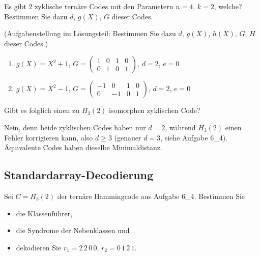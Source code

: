 \begin{aufgabe}[6\_6]
Es gibt 2 zyklische ternäre Codes mit den Parametern $n = 4$, $k = 2$, welche?
Bestimmen Sie dazu $d$, $g(X)$, $G$ dieser Codes.
\end{aufgabe}

\begin{loesung}
(Aufgabenstellung im Lösungsteil: Bestimmen Sie dazu $d$, $g(X)$, $h(X)$, $G$, $H$ dieser Codes.)
\begin{enumerate}
  \item $g(X) = X^2 + 1$, \quad $G = \begin{pmatrix} 1 & 0 & 1 & 0\\ 0 & 1 & 0 & 1 \end{pmatrix}$, \quad $d = 2$, $e = 0$
  \item $g(X) = X^2 - 1$, \quad $G = \begin{pmatrix} -1 & 0 & 1 & 0\\ 0 & -1 & 0 & 1 \end{pmatrix}$, \quad $d = 2$, $e = 0$
\end{enumerate}
\end{loesung}

\begin{aufgabe}[6\_7]
Gibt es folglich einen zu $H_3(2)$ isomorphen zyklischen Code?
\end{aufgabe}

\begin{loesung}
Nein, denn beide zyklischen Codes haben nur $d = 2$, %
während $H_3(2)$ einen Fehler korrigieren kann, also $d \geq 3$ (genauer $d = 3$, siehe Aufgabe 6\_4). Äquivalente Codes haben dieselbe Minimaldistanz.
\end{loesung}

\subsection{Standardarray-Decodierung}

\begin{aufgabe}[6\_8]
Sei $C = H_3(2)$ der ternäre Hammingcode aus Aufgabe 6\_4. Bestimmen Sie
\begin{itemize}
  \item die Klassenführer,
  \item die Syndrome der Nebenklassen und
  \item dekodieren Sie $r_1 = 2\,2\,0\,0$, $r_2 = 0\,1\,2\,1$.
\end{itemize}
\end{aufgabe}

